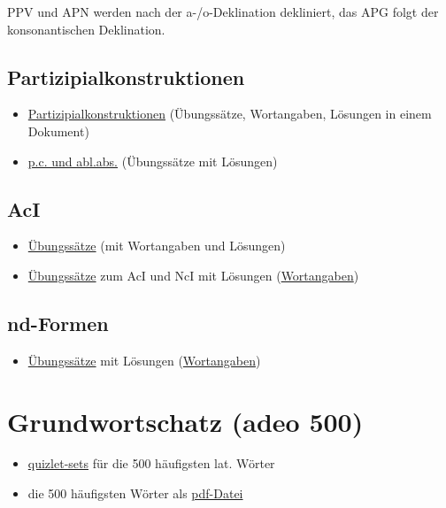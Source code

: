 \documentclass{scrartcl}
\begin{document}
PPV und APN werden nach der a-/o-Deklination dekliniert, das APG folgt der konsonantischen Deklination.

\subsection{Partizipialkonstruktionen}
\label{sec:org8ae33a1}

\begin{itemize}
\item \href{https://www.dropbox.com/s/7hgaz2130uzlw0d/\%25C2\%25A746Partizipialkonstruktionen.pdf?dl=0}{Partizipialkonstruktionen} (Übungssätze, Wortangaben, Lösungen in
einem Dokument)
\item \href{https://www.dropbox.com/s/9uwdu2l7g1kr8gi/PC\_ablabs2.pdf?dl=0}{p.c. und abl.abs.} (Übungssätze mit Lösungen)
\end{itemize}

\subsection{AcI}
\label{sec:orgeb591d5}

\begin{itemize}
\item \href{https://www.dropbox.com/s/p3vtu5snnd3z27r/AcI.pdf?dl=0}{Übungssätze} (mit Wortangaben und Lösungen)
\item \href{https://www.dropbox.com/s/4vx8vgcisfx9wll/AcI\_NcI.pdf?dl=0}{Übungssätze} zum AcI und NcI mit Lösungen (\href{https://www.dropbox.com/s/ef0rmrd1262svd3/Wortangaben\_AcI\_NcI.pdf?dl=0}{Wortangaben})
\end{itemize}

\subsection{nd-Formen}
\label{sec:org412055c}

\begin{itemize}
\item \href{https://www.dropbox.com/s/ykmw8sncd4x5gly/nd-Formen\_Rep.pdf?dl=0}{Übungssätze} mit Lösungen (\href{https://www.dropbox.com/s/psg50w3n8azfi13/Wortangaben\_nd-Formen.pdf?dl=0}{Wortangaben})
\end{itemize}

\section{Grundwortschatz (adeo 500)}
\label{sec:org15ef942}
\begin{itemize}
\item \href{https://quizlet.com/class/1319955/}{quizlet-sets} für die 500 häufigsten lat. Wörter
\item die 500 häufigsten Wörter als \href{https://www.dropbox.com/s/v7m335rmadbrobt/500vocabula.pdf?dl=0}{pdf-Datei}
\end{itemize}
\end{document}
